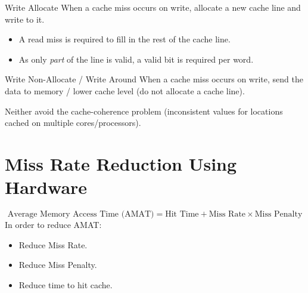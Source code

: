 \begin{definitionbox}{Write Allocate}
	When a cache miss occurs on write, allocate a new cache line and write to it.
	\begin{itemize}
		\item A read miss is required to fill in the rest of the cache line.
		\item As only \textit{part} of the line is valid, a valid bit is required per word.
	\end{itemize}
\end{definitionbox}
\begin{definitionbox}{Write Non-Allocate / Write Around}
	When a cache miss occurs on write, send the data to memory / lower cache level (do not allocate a cache line).

\end{definitionbox}
Neither avoid the cache-coherence problem (inconsistent values for locations cached on multiple cores/processors).

\section{Miss Rate Reduction Using Hardware}
\[\text{Average Memory Access Time (AMAT)} = \text{Hit Time} + \text{Miss Rate} \times \text{Miss Penalty}\]
In order to reduce AMAT:
\begin{itemize}
	\item Reduce Miss Rate.
	\item Reduce Miss Penalty.
	\item Reduce time to hit cache.
\end{itemize}

